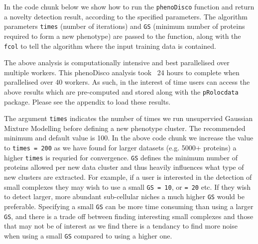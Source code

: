 In the code chunk below we show how to run the \texttt{phenoDisco}
function and return a novelty detection result, according to the
specified parameters. The algorithm parameters \texttt{times} (number
of iterations) and \texttt{GS} (minimum number of proteins required to
form a new phenotype) are passed to the function, along with the
\texttt{fcol} to tell the algorithm where the input training data is
contained.

\begin{knitrout}
\color{fgcolor}\begin{kframe}
\begin{alltt}
 \hlkwb{<-}   \hlstd{=} \hlstd{,}  \hlstd{=} \hlstd{,}  \hlstd{=} \hlstd{)}
\end{alltt}
\end{kframe}
\end{knitrout}

The above analysis is computationally intensive and best parallelised over
multiple workers. This phenoDisco analysis took ~24 hours to complete
when parallelised over 40 workers. As such, in the interest of time 
users can access the above results which are
pre-computed and stored along with the \texttt{pRolocdata} package. 
Please see the appendix to load these results.

The argument \texttt{times} indicates the number of times we run
unsupervied Gaussian Mixture Modelling before defining a new phenotype
cluster.  The recommended minimum and default value is 100. In the
above code chunk we increase the value to \texttt{times = 200} as we
have found for larger datasets (e.g. 5000+ proteins) a higher
\texttt{times} is requried for convergence. \texttt{GS} defines the
minimum number of proteins allowed per new data cluster and thus
heavily influences what type of new clusters are extracted. For
example, if a user is interested in the detection of small complexes
they may wish to use a small \texttt{GS = 10}, or \texttt{= 20} etc.
If they wish to detect larger, more abundant sub-cellular niches a
much higher \texttt{GS} would be preferable. Specifying a small
\texttt{GS} can be more time consuming than using a larger
\texttt{GS}, and there is a trade off between finding interesting
small complexes and those that may not be of interest as we find there
is a tendancy to find more noise when using a small \texttt{GS}
compared to using a higher one.

